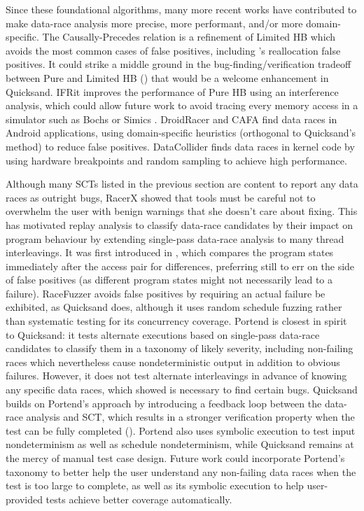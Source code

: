 Since these foundational algorithms,
many more recent works have contributed to make data-race analysis more precise, more performant,
and/or more domain-specific.
The Causally-Precedes relation \cite{predictive-dr} is a refinement of Limited HB which avoids the most common cases of false positives,
including \sect{\ref{sec:quicksand-soundness}}'s reallocation false positives.
It could strike a middle ground in the bug-finding/verification tradeoff
between Pure and Limited HB (\sect{\ref{sec:quicksand-eval}})
that would be a welcome enhancement in Quicksand.
IFRit \cite{ifrit}
improves the performance of Pure HB using an interference analysis,
which could allow future work to avoid tracing every memory access in a simulator such as Bochs \cite{bochs} or Simics \cite{simics}.
%
DroidRacer \cite{droidracer} and CAFA \cite{cafa} find data races in Android applications,
using domain-specific heuristics (orthogonal to Quicksand's method) to reduce false positives.
DataCollider \cite{datacollider} finds data races in kernel code
by using hardware breakpoints and random sampling to achieve high performance.

Although many SCTs listed in the previous section are content to report any data races as outright bugs,
RacerX \cite{racerx} showed that tools must be careful not to overwhelm the user with benign warnings
that she doesn't care about fixing.
This has motivated replay analysis
to classify data-race candidates by their impact on program behaviour
by extending single-pass data-race analysis to many thread interleavings.
It was first introduced in \cite{recordreplaydrs},
which compares the program states immediately after the access pair for differences,
preferring still to err on the side of false positives (as different program states might not necessarily lead to a failure).
RaceFuzzer \cite{racefuzzer} avoids false positives by requiring an actual failure be exhibited, as Quicksand does,
although it uses random schedule fuzzing rather than systematic testing for its concurrency coverage.
%
Portend \cite{portend} is closest in spirit to Quicksand:
it tests alternate executions based on single-pass data-race candidates to classify them in a taxonomy of likely severity,
including non-failing races which nevertheless cause nondeterministic output
in addition to obvious failures.
However, it does not
test alternate interleavings in advance of knowing any specific data races,
which \sect{\ref{sec:quicksand-eval}} showed is necessary to find certain bugs.
Quicksand builds on Portend's approach by introducing a feedback loop between the data-race analysis and SCT,
which results in a stronger verification property
when the test can be fully completed (\sect{\ref{sec:quicksand-soundness}}).
Portend also uses symbolic execution to test input nondeterminism as well as schedule nondeterminism,
while Quicksand remains at the mercy of manual test case design.
Future work could incorporate Portend's taxonomy to better help the user understand any non-failing data races
when the test is too large to complete,
as well as its symbolic execution to help user-provided tests achieve better coverage automatically.

